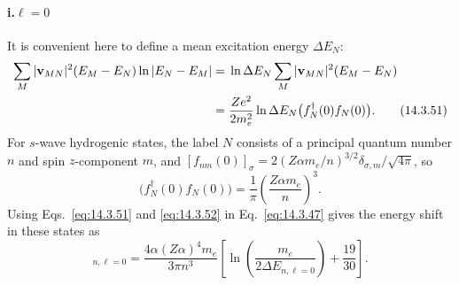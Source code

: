 \paragraph{i.\quad $\ell=0$}
It is convenient here to define a mean excitation energy $\Delta E_N$:
\begin{align}
\sum_M|\mathbf v_{MN}|^2(E_M-E_N)\ln|E_N-E_M|
={}&\ln\Delta E_N\sum_M|\mathbf v_{MN}|^2(E_M-E_N)\notag\\
={}&\frac{Ze^2}{2m_e^2}\ln\Delta E_N
\bigl(f_N^\dagger(0)f_N(0)\bigr).
\tag{14.3.51}\label{eq:14.3.51}
\end{align}
For $s$-wave hydrogenic states, the label $N$ consists of a principal quantum
number $n$ and spin $z$-component $m$, and
$[f_{nm}(0)]_\sigma=2(Z\alpha m_e/n)^{3/2}
\delta_{\sigma,m}/\sqrt{4\pi}$, so
\begin{equation}
\bigl(f_N^\dagger(0)f_N(0)\bigr)
=\frac1\pi\left(\frac{Z\alpha m_e}{n}\right)^3.
\tag{14.3.52}\label{eq:14.3.52}
\end{equation}
Using Eqs.~\eqref{eq:14.3.51} and \eqref{eq:14.3.52} in
Eq.~\eqref{eq:14.3.47} gives the energy shift in these states as
\begin{equation}
[\delta E]_{n,\ell=0}=\frac{4\alpha(Z\alpha)^4m_e}{3\pi n^3}
\left[\ln\left(\frac{m_e}{2\Delta E_{n,\ell=0}}\right)+\frac{19}{30}\right].
\tag{14.3.53}\label{eq:14.3.53}
\end{equation}

